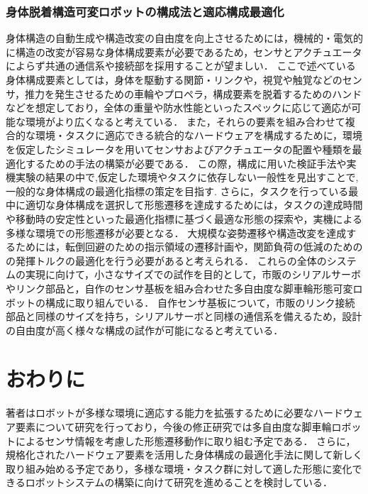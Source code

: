 \documentclass[twocolumn]{d-abst}
\begin{document}
\subsubsection{身体脱着構造可変ロボットの構成法と適応構成最適化}
身体構造の自動生成や構造改変の自由度を向上させるためには，機械的・電気的に構造の改変が容易な身体構成要素が必要であるため，センサとアクチュエータによらず共通の通信系や接続部を採用することが望ましい．
ここで述べている身体構成要素としては，身体を駆動する関節・リンクや，視覚や触覚などのセンサ，推力を発生させるための車輪やプロペラ，構成要素を脱着するためのハンドなどを想定しており，全体の重量や防水性能といったスペックに応じて適応が可能な環境がより広くなると考えている．
また，それらの要素を組み合わせて複合的な環境・タスクに適応できる統合的なハードウェアを構成するために，環境を仮定したシミュレータを用いてセンサおよびアクチュエータの配置や種類を最適化するための手法の構築が必要である．
この際，構成に用いた検証手法や実機実験の結果の中で,仮定した環境やタスクに依存しない一般性を見出すことで, 一般的な身体構成の最適化指標の策定を目指す.
さらに，タスクを行っている最中に適切な身体構成を選択して形態遷移を達成するためには，タスクの達成時間や移動時の安定性といった最適化指標に基づく最適な形態の探索や，実機による多様な環境での形態遷移が必要となる．
大規模な姿勢遷移や構造改変を達成するためには，転倒回避のための指示領域の遷移計画や，関節負荷の低減のためのの発揮トルクの最適化を行う必要があると考えられる．
これらの全体のシステムの実現に向けて，小さなサイズでの試作を目的として，市販のシリアルサーボやリンク部品と，自作のセンサ基板を組み合わせた多自由度な脚車輪形態可変ロボットの構成に取り組んでいる．
自作センサ基板について，市販のリンク接続部品と同様のサイズを持ち，シリアルサーボと同様の通信系を備えるため，設計の自由度が高く様々な構成の試作が可能になると考えている．

\section{おわりに}
著者はロボットが多様な環境に適応する能力を拡張するために必要なハードウェア要素について研究を行っており，今後の修正研究では多自由度な脚車輪ロボットによるセンサ情報を考慮した形態遷移動作に取り組む予定である．
さらに，規格化されたハードウェア要素を活用した身体構成の最適化手法に関して新しく取り組み始める予定であり，多様な環境・タスク群に対して適した形態に変化できるロボットシステムの構築に向けて研究を進めることを検討している．



\end{document}
